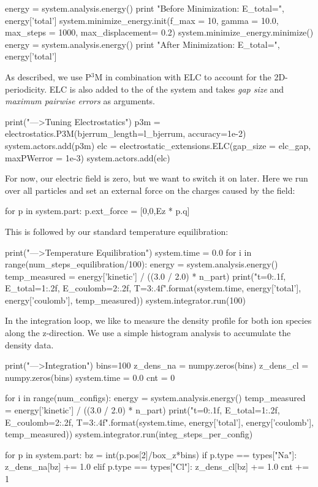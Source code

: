 \documentclass[
a4paper,                        %
11pt,                           %
twoside,                        %
footsepline,                    %
headsepline,                    %
headexclude,                    %
footexclude,                    %
pagesize,                       %
]{scrartcl}
\begin{document}
\begin{pypresso}
energy = system.analysis.energy()
print "Before Minimization: E_total=", energy['total']
system.minimize_energy.init(f_max = 10, gamma = 10.0, 
        max_steps = 1000, max_displacement= 0.2)
system.minimize_energy.minimize()
energy = system.analysis.energy()
print "After Minimization: E_total=", energy['total']
\end{pypresso}

As described, we use P$^3$M in combination with ELC to account for the 2D-periodicity. 
ELC is also added to the  of the system and takes \emph{gap size} and \emph{maximum
pairwise errors} as arguments.

\begin{pypresso}
print("\n--->Tuning Electrostatics")
p3m = electrostatics.P3M(bjerrum_length=l_bjerrum, 
        accuracy=1e-2)
system.actors.add(p3m)
elc = electrostatic_extensions.ELC(gap_size = elc_gap, 
        maxPWerror = 1e-3)
system.actors.add(elc)
\end{pypresso}

For now, our electric field is zero, but we want to switch it on later.
Here we run over all particles and set an external force on the charges caused 
by the field:

\begin{pypresso}
for p in system.part:
    p.ext_force = [0,0,Ez * p.q]
\end{pypresso}

This is followed by our standard temperature equilibration:

\begin{pypresso}
print("\n--->Temperature Equilibration")
system.time = 0.0
for i in range(num_steps_equilibration/100):
    energy = system.analysis.energy()
    temp_measured = energy['kinetic'] / ((3.0 / 2.0) * n_part)
    print("t={0:.1f}, E_total={1:.2f}, E_coulomb={2:.2f},
          T={3:.4f}".format(system.time, energy['total'],
          energy['coulomb'], temp_measured))
    system.integrator.run(100)
\end{pypresso}

In the integration loop, we like to measure the density profile for both ion species along the z-direction.
We use a simple histogram analysis to accumulate the density data.

\begin{pypresso}
print("\n--->Integration")
bins=100
z_dens_na = numpy.zeros(bins)
z_dens_cl = numpy.zeros(bins)
system.time = 0.0
cnt = 0

for i in range(num_configs):
    energy = system.analysis.energy()
    temp_measured = energy['kinetic'] / ((3.0 / 2.0) * n_part)
    print("t={0:.1f}, E_total={1:.2f}, E_coulomb={2:.2f},
          T={3:.4f}".format(system.time, energy['total'],
          energy['coulomb'], temp_measured))
    system.integrator.run(integ_steps_per_config)

    for p in system.part:
        bz = int(p.pos[2]/box_z*bins)
        if p.type == types["Na"]:
            z_dens_na[bz] += 1.0
        elif p.type == types["Cl"]:
            z_dens_cl[bz] += 1.0
    cnt += 1
\end{pypresso}
\end{document}

